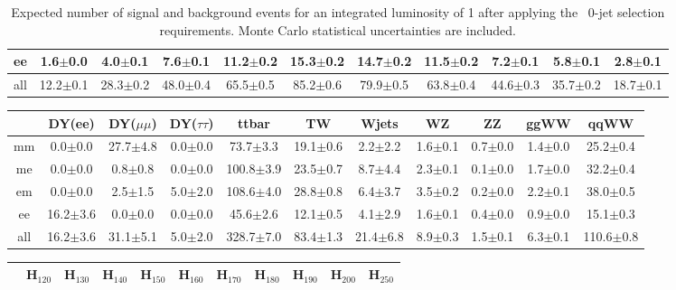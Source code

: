 \begin{table}[!ht]
\begin{center}
{\begin{tabular} {|c|c|c|c|c|c|c|c|c|c|c|}
  ee &  1.6$\pm$0.0 &  4.0$\pm$0.1 &  7.6$\pm$0.1 & 11.2$\pm$0.2 & 15.3$\pm$0.2 & 14.7$\pm$0.2 & 11.5$\pm$0.2 &  7.2$\pm$0.1 &  5.8$\pm$0.1 &  2.8$\pm$0.1 \\
  \hline
 all & 12.2$\pm$0.1 & 28.3$\pm$0.2 & 48.0$\pm$0.4 & 65.5$\pm$0.5 & 85.2$\pm$0.6 & 79.9$\pm$0.5 & 63.8$\pm$0.4 & 44.6$\pm$0.3 & 35.7$\pm$0.2 & 18.7$\pm$0.1 \\
 \hline
  \end{tabular}
  }
  \caption{Expected number of signal and background events for an 
  integrated luminosity of 1\ifb{} after 
  applying the \ww\ 0-jet selection requirements. Monte Carlo statistical uncertainties are 
  included.}
   \label{tab:wwselection0}
  \end{center}
\end{table}

\begin{table}[!ht]
  \begin{center}
 {\small
  \begin{tabular} {|c|c|c|c|c|c|c|c|c|c|c|}
\hline
  & DY(ee) & DY($\mu\mu$) & DY($\tau\tau$) & ttbar & TW & Wjets & WZ & ZZ & ggWW & qqWW \\
  \hline
  \hline
  mm &  0.0$\pm$0.0 & 27.7$\pm$4.8 &  0.0$\pm$0.0 & 73.7$\pm$3.3 & 19.1$\pm$0.6 &  2.2$\pm$2.2 &  1.6$\pm$0.1 &  0.7$\pm$0.0 &  1.4$\pm$0.0 & 25.2$\pm$0.4 \\
  me &  0.0$\pm$0.0 &  0.8$\pm$0.8 &  0.0$\pm$0.0 & 100.8$\pm$3.9 & 23.5$\pm$0.7 &  8.7$\pm$4.4 &  2.3$\pm$0.1 &  0.1$\pm$0.0 &  1.7$\pm$0.0 & 32.2$\pm$0.4 \\
  em &  0.0$\pm$0.0 &  2.5$\pm$1.5 &  5.0$\pm$2.0 & 108.6$\pm$4.0 & 28.8$\pm$0.8 &  6.4$\pm$3.7 &  3.5$\pm$0.2 &  0.2$\pm$0.0 &  2.2$\pm$0.1 & 38.0$\pm$0.5 \\
  ee & 16.2$\pm$3.6 &  0.0$\pm$0.0 &  0.0$\pm$0.0 & 45.6$\pm$2.6 & 12.1$\pm$0.5 &  4.1$\pm$2.9 &  1.6$\pm$0.1 &  0.4$\pm$0.0 &  0.9$\pm$0.0 & 15.1$\pm$0.3 \\
 \hline
 all & 16.2$\pm$3.6 & 31.1$\pm$5.1 &  5.0$\pm$2.0 & 328.7$\pm$7.0 & 83.4$\pm$1.3 & 21.4$\pm$6.8 &  8.9$\pm$0.3 &  1.5$\pm$0.1 &  6.3$\pm$0.1 & 110.6$\pm$0.8 \\
 \hline
  \end{tabular}
  }
 {\small
  \begin{tabular} {|c|c|c|c|c|c|c|c|c|c|c|}
  \hline
     &   H$_{120}$ &  H$_{130}$ &    H$_{140}$ &   H$_{150}$ &   H$_{160}$ &   H$_{170}$ &   H$_{180}$ &   H$_{190}$ &   H$_{200}$ &   H$_{250}$ \\
  \hline
  \hline

\end{tabular}}
\end{center}
\end{table}
